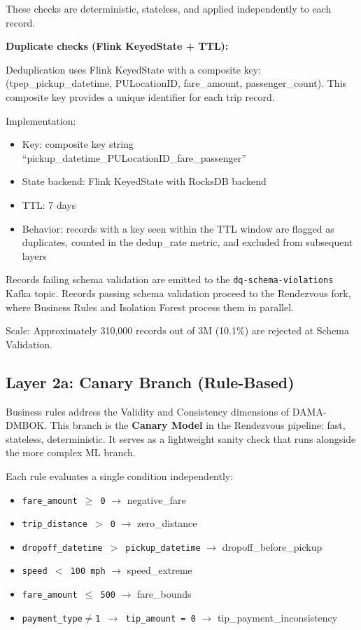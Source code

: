 These checks are deterministic, stateless, and applied independently to each record.

\textbf{Duplicate checks (Flink KeyedState + TTL):}

Deduplication uses Flink KeyedState with a composite key: (tpep\_pickup\_datetime, PULocationID, fare\_amount, passenger\_count). This composite key provides a unique identifier for each trip record.

Implementation:
\begin{itemize}
    \item Key: composite key string ``pickup\_datetime\_PULocationID\_fare\_passenger''
    \item State backend: Flink KeyedState with RocksDB backend
    \item TTL: 7 days
    \item Behavior: records with a key seen within the TTL window are flagged as duplicates, counted in the dedup\_rate metric, and excluded from subsequent layers
\end{itemize}

Records failing schema validation are emitted to the \texttt{dq-schema-violations} Kafka topic. Records passing schema validation proceed to the Rendezvous fork, where Business Rules and Isolation Forest process them in parallel.

Scale: Approximately 310,000 records out of 3M (10.1\%) are rejected at Schema Validation.

\subsection{Layer 2a: Canary Branch (Rule-Based)}

Business rules address the Validity and Consistency dimensions of DAMA-DMBOK. This branch is the \textbf{Canary Model} in the Rendezvous pipeline: fast, stateless, deterministic. It serves as a lightweight sanity check that runs alongside the more complex ML branch.

Each rule evaluates a single condition independently:

\begin{itemize}
    \item \texttt{fare\_amount $\geq$ 0} $\to$ negative\_fare
    \item \texttt{trip\_distance $>$ 0} $\to$ zero\_distance
    \item \texttt{dropoff\_datetime $>$ pickup\_datetime} $\to$ dropoff\_before\_pickup
    \item \texttt{speed $<$ 100 mph} $\to$ speed\_extreme
    \item \texttt{fare\_amount $\leq$ 500} $\to$ fare\_bounds
    \item \texttt{payment\_type$\neq$1 $\to$ tip\_amount = 0} $\to$ tip\_payment\_inconsistency
\end{itemize}

